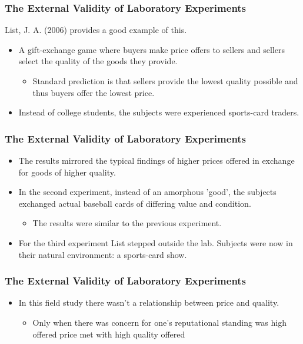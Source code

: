 \documentclass{beamer}
\begin{document}
\begin{frame}
	\frametitle{The External Validity of Laboratory Experiments}
	
	List, J. A. (2006) provides a good example of this.
	
	\begin{itemize}
		\item A gift-exchange game where buyers make price offers to sellers and sellers select the quality of the goods they provide.
		\begin{itemize}
			\item Standard prediction is that sellers provide the lowest quality possible and thus buyers offer the lowest price.
		\end{itemize}
		\item Instead of college students, the subjects were experienced sports-card traders.
		
	\end{itemize}
	
\end{frame}


\begin{frame}
	\frametitle{The External Validity of Laboratory Experiments}

	
	\begin{itemize}
		\item The results mirrored the typical findings of higher prices offered in exchange for goods of higher quality.
		\item In the second experiment, instead of an amorphous 'good', the subjects exchanged actual baseball cards of differing value and condition.
		\begin{itemize}
			\item The results were similar to the previous experiment.
		\end{itemize}
		\item For the third experiment List stepped outside the lab. Subjects were now in their natural environment: a sports-card show.
	\end{itemize}
\end{frame}

\begin{frame}
	\frametitle{The External Validity of Laboratory Experiments}
	
	\begin{itemize}

		\item In this field study there wasn't a relationship between price and quality.
		\begin{itemize}
			\item Only when there was concern for one's reputational standing was high offered price met with high quality offered
		\end{itemize} 
	\end{itemize}
\end{frame}
\end{document}
